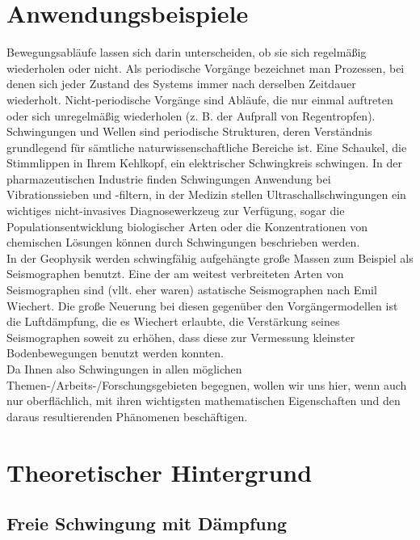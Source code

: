 \section{Anwendungsbeispiele}
%
Bewegungsabläufe lassen sich darin unterscheiden, ob sie sich regelmäßig wiederholen oder nicht. Als periodische Vorgänge bezeichnet man Prozessen, bei denen sich jeder Zustand des Systems immer nach derselben Zeitdauer wiederholt. Nicht-periodische Vorgänge sind Abläufe, die nur einmal auftreten oder sich unregelmäßig wiederholen (z. B. der Aufprall von Regentropfen).\\
Schwingungen und Wellen sind periodische Strukturen, deren Verständnis grundlegend für sämtliche naturwissenschaftliche Bereiche ist. Eine Schaukel, die Stimmlippen in Ihrem Kehlkopf, ein elektrischer Schwingkreis schwingen. In der pharmazeutischen Industrie finden Schwingungen Anwendung bei Vibrationssieben und -filtern, in der Medizin stellen Ultraschallschwingungen ein wichtiges nicht-invasives Diagnosewerkzeug zur Verfügung, sogar die Populationsentwicklung biologischer Arten oder die Konzentrationen von chemischen Lösungen können durch Schwingungen beschrieben werden.\\
In der Geophysik werden schwingfähig aufgehängte große Massen zum Beispiel als Seismographen benutzt. Eine der am weitest verbreiteten Arten von Seismographen sind (vllt. eher waren) astatische Seismographen nach Emil Wiechert. Die große Neuerung bei diesen gegenüber den Vorgängermodellen ist die Luftdämpfung, die es Wiechert erlaubte, die Verstärkung seines Seismographen soweit zu erhöhen, dass diese zur Vermessung kleinster Bodenbewegungen benutzt werden konnten.\\

\noindent
Da Ihnen also Schwingungen in allen möglichen Themen-/Arbeits-/Forschungsgebieten begegnen, wollen wir uns hier, wenn auch nur oberflächlich, mit ihren wichtigsten mathematischen Eigenschaften und den daraus resultierenden Phänomenen beschäftigen.
%
\section{Theoretischer Hintergrund}

\subsection{Freie Schwingung mit Dämpfung}

